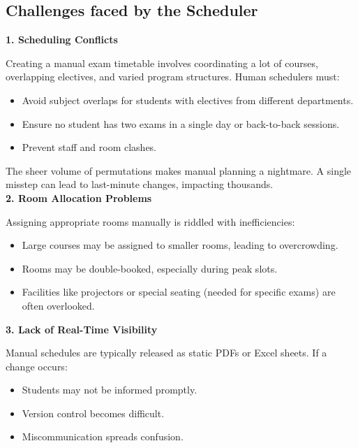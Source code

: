 \documentclass[a4paper,12pt]{article}
\begin{document}
\subsection{Challenges faced by  the Scheduler}

\textbf{1. Scheduling Conflicts\newline}

Creating a manual exam timetable involves coordinating a lot of courses, overlapping electives, and varied program structures. Human schedulers must:

\begin{itemize}
\item Avoid subject overlaps for students with electives from different departments.

\item Ensure no student has two exams in a single day or back-to-back sessions.

\item Prevent staff and room clashes.
\end{itemize}

The sheer volume of permutations makes manual planning a nightmare. A single misstep can lead to last-minute changes, impacting thousands.\newline\\
\textbf{2. Room Allocation Problems}

Assigning appropriate rooms manually is riddled with inefficiencies:

\begin{itemize}
     
\item Large courses may be assigned to smaller rooms, leading to overcrowding.

\item Rooms may be double-booked, especially during peak slots.

\item Facilities like projectors or special seating (needed for specific exams) are often overlooked.
\end{itemize}

\newpage

\noindent\textbf{3. Lack of Real-Time Visibility}

Manual schedules are typically released as static PDFs or Excel sheets. If a change occurs:

\begin{itemize} 
\item Students may not be informed promptly.

\item Version control becomes difficult.

\item Miscommunication spreads confusion.
\end{itemize}
\end{document}
